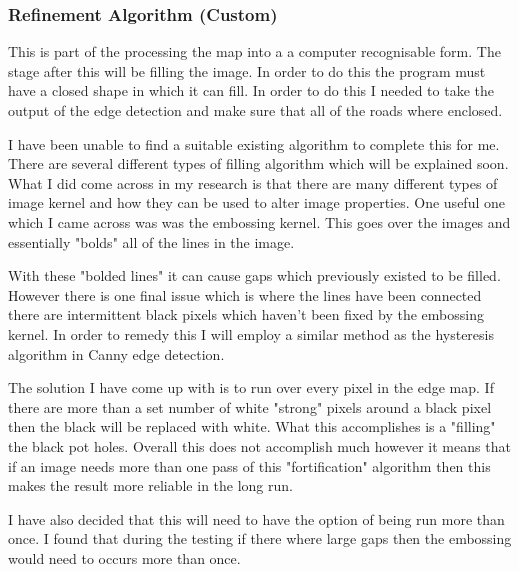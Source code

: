 \begin{FlushLeft}
    \bk

    \subsubsection{Refinement Algorithm (Custom)}
    This is part of the processing the map into a a computer recognisable form. The stage after this will be filling the image. In order to do this the program must have a closed shape in which it can fill. In order to do this I needed to take the output of the edge detection and make sure that all of the roads where enclosed. \\ \bk

    I have been unable to find a suitable existing algorithm to complete this for me. There are several different types of filling algorithm which will be explained soon. What I did come across in my research is that there are many different types of image kernel and how they can be used to alter image properties. One useful one which I came across was was the embossing kernel. This goes over the images and essentially "bolds" all of the lines in the image. \\ \bk

    With these "bolded lines" it can cause gaps which previously existed to be filled. However there is one final issue which is where the lines have been connected there are intermittent black pixels which haven't been fixed by the embossing kernel. In order to remedy this I will employ a similar method as the hysteresis algorithm in Canny edge detection. \\ \bk
    
    The solution I have come up with is to run over every pixel in the edge map. If there are more than a set number of white "strong" pixels around a black pixel then the black will be replaced with white. What this accomplishes is a "filling" the black pot holes. Overall this does not accomplish much however it means that if an image needs more than one pass of this "fortification" algorithm then this makes the result more reliable in the long run. \\ \bk

    I have also decided that this will need to have the option of being run more than once. I found that during the testing if there where large gaps then the embossing would need to occurs more than once.\\
    \bk


\end{FlushLeft}
